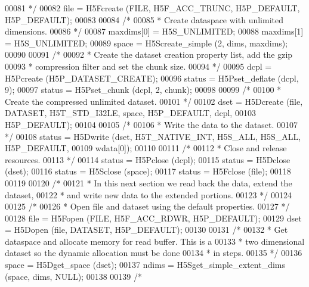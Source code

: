 \begin{DoxyCode}
00081 \textcolor{comment}{     */}
00082     file = H5Fcreate (FILE, H5F\_ACC\_TRUNC, H5P\_DEFAULT, H5P\_DEFAULT);
00083 
00084     \textcolor{comment}{/*}
00085 \textcolor{comment}{     * Create dataspace with unlimited dimensions.}
00086 \textcolor{comment}{     */}
00087     maxdims[0] = H5S\_UNLIMITED;
00088     maxdims[1] = H5S\_UNLIMITED;
00089     space = H5Screate\_simple (2, dims, maxdims);
00090 
00091     \textcolor{comment}{/*}
00092 \textcolor{comment}{     * Create the dataset creation property list, add the gzip}
00093 \textcolor{comment}{     * compression filter and set the chunk size.}
00094 \textcolor{comment}{     */}
00095     dcpl = H5Pcreate (H5P\_DATASET\_CREATE);
00096     status = H5Pset\_deflate (dcpl, 9);
00097     status = H5Pset\_chunk (dcpl, 2, chunk);
00098 
00099     \textcolor{comment}{/*}
00100 \textcolor{comment}{     * Create the compressed unlimited dataset.}
00101 \textcolor{comment}{     */}
00102     dset = H5Dcreate (file, DATASET, H5T\_STD\_I32LE, space, H5P\_DEFAULT, dcpl,
00103                 H5P\_DEFAULT);
00104 
00105     \textcolor{comment}{/*}
00106 \textcolor{comment}{     * Write the data to the dataset.}
00107 \textcolor{comment}{     */}
00108     status = H5Dwrite (dset, H5T\_NATIVE\_INT, H5S\_ALL, H5S\_ALL, H5P\_DEFAULT,
00109                 wdata[0]);
00110 
00111     \textcolor{comment}{/*}
00112 \textcolor{comment}{     * Close and release resources.}
00113 \textcolor{comment}{     */}
00114     status = H5Pclose (dcpl);
00115     status = H5Dclose (dset);
00116     status = H5Sclose (space);
00117     status = H5Fclose (file);
00118 
00119 
00120     \textcolor{comment}{/*}
00121 \textcolor{comment}{     * In this next section we read back the data, extend the dataset,}
00122 \textcolor{comment}{     * and write new data to the extended portions.}
00123 \textcolor{comment}{     */}
00124 
00125     \textcolor{comment}{/*}
00126 \textcolor{comment}{     * Open file and dataset using the default properties.}
00127 \textcolor{comment}{     */}
00128     file = H5Fopen (FILE, H5F\_ACC\_RDWR, H5P\_DEFAULT);
00129     dset = H5Dopen (file, DATASET, H5P\_DEFAULT);
00130 
00131     \textcolor{comment}{/*}
00132 \textcolor{comment}{     * Get dataspace and allocate memory for read buffer.  This is a}
00133 \textcolor{comment}{     * two dimensional dataset so the dynamic allocation must be done}
00134 \textcolor{comment}{     * in steps.}
00135 \textcolor{comment}{     */}
00136     space = H5Dget\_space (dset);
00137     ndims = H5Sget\_simple\_extent\_dims (space, dims, NULL);
00138 
00139     \textcolor{comment}{/*}

\end{DoxyCode}
